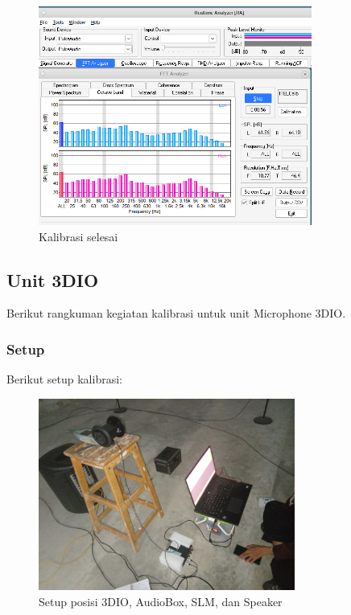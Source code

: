 \documentclass{article}
\begin{document}
\begin{itemize}
		\begin{figure}[H]
			\centering
			\includegraphics[width=0.8\textwidth,angle=0]{images/rta_fft}
			\caption{Kalibrasi selesai}
		\end{figure}
		
	\end{itemize}

	\newpage
	
	\subsection{Unit 3DIO}
	
	Berikut rangkuman kegiatan kalibrasi untuk unit Microphone 3DIO.

	\subsubsection{Setup}
	
	Berikut setup kalibrasi:
	
	\begin{figure}[H]
		\centering
		\includegraphics[width=0.75\textwidth,angle=0]{images/3dio_setup}
		\caption{Setup posisi 3DIO, AudioBox, SLM, dan Speaker}
	\end{figure}
\end{document}
